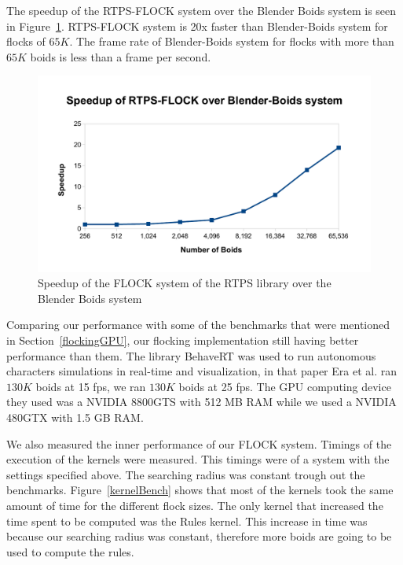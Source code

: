 The speedup of the RTPS-FLOCK system over the Blender Boids system is seen in Figure~\ref{speedup}. RTPS-FLOCK system is 20x faster than Blender-Boids system for flocks of $65K$. The frame rate of Blender-Boids system for flocks with more than $65K$ boids is less than a frame per second.

\begin{figure}[htbp]
\begin{center}
\includegraphics[scale=0.7]{figures/speedup.pdf}
\caption{Speedup of the FLOCK system of the RTPS library over the Blender Boids system}
\label{speedup}
\end{center}
\end{figure}

Comparing our performance with some of the benchmarks that were mentioned in Section~\ref{flockingGPU}, our flocking implementation still having better performance than them. The library BehaveRT was used to run autonomous characters simulations in real-time and visualization, in that paper Era et al. ran $130K$ boids at 15 fps, we ran $130K$ boids at 25 fps. The GPU computing device they used was a NVIDIA 8800GTS with 512 MB RAM while we used a NVIDIA 480GTX with 1.5 GB RAM. 

We also measured the inner performance of our FLOCK system. Timings of the execution of the kernels were measured. This timings were of a system with the settings specified above. The searching radius was constant trough out the benchmarks. Figure~\ref{kernelBench} shows that most of the kernels took the same amount of time for the different flock sizes. The only kernel that increased the time spent to be computed was the Rules kernel. This increase in time was because our searching radius was constant, therefore more boids are going to be used to compute the rules.


